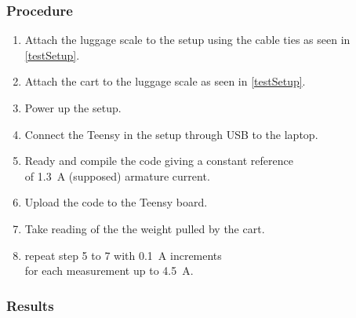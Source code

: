 \subsubsection{Procedure}

\begin{enumerate}
  \item Attach the luggage scale to the setup using the cable ties as seen in \autoref{testSetup}.
  \item Attach the cart to the luggage scale as seen in \autoref{testSetup}.
  \item Power up the setup.
  \item Connect the Teensy in the setup through USB to the laptop.
  \item Ready and compile the code giving a constant reference\\ of \SI{1.3}{A} (supposed) armature current.
  \item Upload the code to the Teensy board.
  \item Take reading of the the weight pulled by the cart.
  \item repeat step 5 to 7 with \SI{0.1}{A} increments\\ for each measurement up to \SI{4.5}{A}.
\end{enumerate}

\subsubsection{Results}


